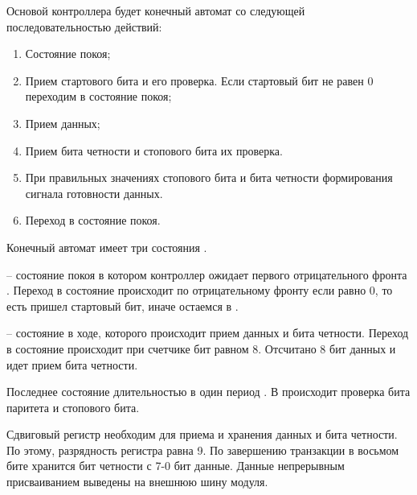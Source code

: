 \par{Основой контроллера будет конечный автомат со следующей последовательностью действий:}
  \begin{enumerate}[noitemsep,topsep=0pt, after=\vspace{2pt}]
    \item Состояние покоя;
    \item Прием стартового бита и его проверка. Если стартовый бит не равен 0 переходим в состояние покоя;
    \item Прием данных;
    \item Прием бита четности и стопового бита их проверка.
    \item При правильных значениях стопового бита и бита четности формирования сигнала готовности данных.
    \item Переход в состояние покоя.
  \end{enumerate}



\par{Конечный автомат имеет три состояния .}

\par{ – состояние покоя в котором контроллер ожидает первого отрицательного фронта . Переход в состояние  происходит по отрицательному фронту  если  равно 0, то есть пришел стартовый бит, иначе остаемся в .}

\par{ – состояние в ходе, которого происходит прием данных и бита четности. Переход в состояние  происходит при счетчике бит равном 8. Отсчитано 8 бит данных и идет прием бита четности.}

\par{Последнее состояние  длительностью в один период . В  происходит проверка бита паритета и стопового бита.}



\par{Сдвиговый регистр необходим для приема и хранения данных и бита четности. По этому, разрядность регистра равна 9. По завершению транзакции в восьмом бите хранится бит четности с 7-0 бит данные. Данные непрерывным присваиванием выведены на внешнюю шину модуля.}

